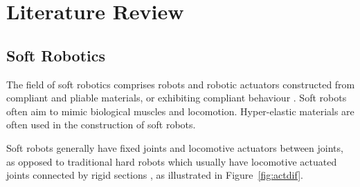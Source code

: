 \chapter{Literature Review}
\label{chp:LR}

\section{Soft Robotics}

The field of soft robotics comprises robots and robotic actuators constructed from compliant and pliable materials, or exhibiting compliant behaviour \citep{Wang2015, Ilievski2011}. Soft robots often aim to mimic biological muscles and locomotion. Hyper-elastic materials are often used in the construction of soft robots.

Soft robots generally have fixed joints and locomotive actuators between joints, as opposed to traditional hard robots which usually have locomotive actuated joints connected by rigid sections \citep{Whitesides2018}, as illustrated in Figure~\ref{fig:actdif}.

